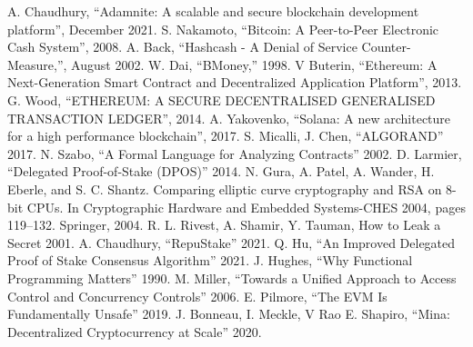 \documentclass[conference]{IEEEtran}
\begin{document}
\begin{thebibliography}{00}
 A. Chaudhury, ``Adamnite: A scalable and secure
blockchain development platform'', December 2021.
 S. Nakamoto, ``Bitcoin: A Peer-to-Peer Electronic Cash System'', 2008.
 A. Back, ``Hashcash - A Denial of Service Counter-Measure,'', August 2002.
 W. Dai, ``BMoney,'' 1998.
 V Buterin, ``Ethereum: A Next-Generation Smart
Contract and Decentralized Application Platform'',
2013.
 G. Wood, ``ETHEREUM: A SECURE DECENTRALISED GENERALISED TRANSACTION LEDGER'', 2014.
 A. Yakovenko, ``Solana: A new architecture for a high
performance blockchain'', 2017.
 S. Micalli, J. Chen, ``ALGORAND'' 2017.
 N. Szabo, ``A Formal Language for Analyzing Contracts'' 2002.
 D. Larmier, ``Delegated Proof-of-Stake (DPOS)'' 2014.
 N. Gura, A. Patel, A. Wander, H. Eberle,
and S. C. Shantz. Comparing elliptic curve
cryptography and RSA on 8-bit CPUs. In Cryptographic
Hardware and Embedded Systems-CHES 2004, pages
119–132. Springer, 2004.
 R. L. Rivest, A. Shamir, Y. Tauman, How to Leak a Secret 2001.
 A. Chaudhury, ``RepuStake'' 2021.
 Q. Hu, ``An Improved Delegated Proof of Stake Consensus Algorithm'' 2021.
 J. Hughes, ``Why
Functional Programming
Matters'' 1990.
 M. Miller, ``Towards a Unified Approach to Access Control and Concurrency Controls'' 2006.
 E. Pilmore, ``The EVM Is Fundamentally Unsafe'' 2019.
 J. Bonneau, I. Meckle, V Rao
 E. Shapiro, ``Mina: Decentralized Cryptocurrency at Scale'' 2020.
 




\end{thebibliography}
\end{document}
